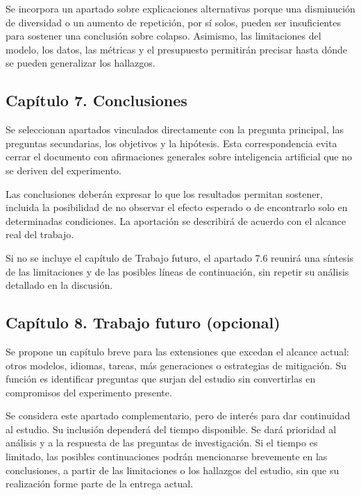 \documentclass[12pt,letterpaper]{article}
\begin{document}
Se incorpora un apartado sobre explicaciones alternativas porque una
disminución de diversidad o un aumento de repetición, por sí solos, pueden
ser insuficientes para sostener una conclusión sobre colapso. Asimismo,
las limitaciones del modelo, los datos, las métricas y el presupuesto
permitirán precisar hasta dónde se pueden generalizar los hallazgos.

\subsection*{Capítulo 7. Conclusiones}
Se seleccionan apartados vinculados directamente con la pregunta principal,
las preguntas secundarias, los objetivos y la hipótesis. Esta correspondencia
evita cerrar el documento con afirmaciones generales sobre inteligencia
artificial que no se deriven del experimento.

Las conclusiones deberán expresar lo que los resultados permitan sostener,
incluida la posibilidad de no observar el efecto esperado o de encontrarlo
solo en determinadas condiciones. La aportación se describirá de acuerdo con
el alcance real del trabajo.

Si no se incluye el capítulo de Trabajo futuro, el apartado 7.6 reunirá
una síntesis de las limitaciones y de las posibles líneas de continuación,
sin repetir su análisis detallado en la discusión.

\subsection*{Capítulo 8. Trabajo futuro (opcional)}
Se propone un capítulo breve para las extensiones que excedan el alcance
actual: otros modelos, idiomas, tareas, más generaciones o estrategias de
mitigación. Su función es identificar preguntas que surjan del estudio sin
convertirlas en compromisos del experimento presente.

Se considera este apartado complementario, pero de interés para dar
continuidad al estudio. Su inclusión dependerá del tiempo disponible.
Se dará prioridad
al análisis y a la respuesta de las preguntas de investigación. Si el tiempo
es limitado, las posibles continuaciones podrán mencionarse brevemente en
las conclusiones, a partir de las limitaciones o los hallazgos del estudio,
sin que su realización forme parte de la entrega actual.
\end{document}
